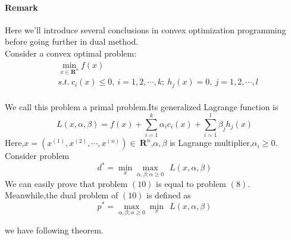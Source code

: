 \paragraph{Remark} Here we'll introduce several conclusions in convex optimization programming before going further in dual method.
\\Consider a convex optimal problem:
\begin{equation}
\begin{split}
&\min_{x\in\textbf{R}^n} f(x)\\
&s.t.\ c_{i}(x)\leq 0,\ i=1,2,\cdots,k;\ h_{j}(x)=0,\ j=1,2,\cdots,l
\end{split}
\end{equation}
\\We call this problem a primal problem.Its generalized Lagrange function is
\begin{equation}
L(x,\alpha,\beta)=f(x)+\sum\limits_{i=1}^{k}\alpha_{i}c_{i}(x)+\sum\limits_{i=1}^{l}\beta_{j}h_{j}(x)
\end{equation}
Here,$x=(x^{(1)},x^{(2)},\cdots,x^{(n)})\in\ \mathbf{R}^n$,$\alpha,\beta$ is Lagrange multiplier,$\alpha_{i}\geq 0$.
\\Consider problem
\begin{equation}
d^*=\min\limits_{x}\max\limits_{\alpha,\beta;\alpha\geq 0}\ \ L(x,\alpha,\beta)
\end{equation}
We can easily prove that problem $(10)$ is equal to problem $(8)$.
Meanwhile,the dual problem of $(10)$ is defined as
\begin{equation}
p^*=\max\limits_{\alpha,\beta;\alpha\geq 0}\min\limits_{x}\ \ L(x,\alpha,\beta)
\end{equation}

we have following theorem.

